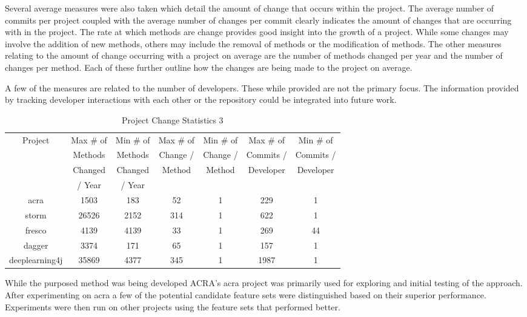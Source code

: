 Several average measures were also taken which detail the amount of change that occurs within the project. The average number of commits per project coupled with the average number of changes per commit clearly indicates the amount of changes that are occurring with in the project. The rate at which methods are change provides good insight into the growth of a project. While some changes may involve the addition of new methods, others may include the removal of methods or the modification of methods. The other measures relating to the amount of change occurring with a project on average are the number of methods changed per year and the number of changes per method. Each of these further outline how the changes are being made to the project on average.

A few of the measures are related to the number of developers. These while provided are not the primary focus. The information provided by tracking developer interactions with each other or the repository could be integrated into future work.

\begin{table}
\begin{center}
    \begin{tabular}{|c|c|c|c|c|c|c|}
        \hline
        Project & Max \# of & Min \# of & Max \# of & Min \# of & Max \# of & Min \# of \\
         & Methods & Methods & Change / & Change / & Commits / & Commits / \\
         & Changed & Changed & Method & Method & Developer & Developer \\
         & / Year & / Year & & & & \\
        \hline
        acra & 1503 & 183 & 52 & 1 & 229 & 1 \\
        storm & 26526 & 2152 & 314 & 1 & 622 & 1\\
        fresco & 4139 & 4139 & 33 & 1 & 269 & 44 \\
        dagger & 3374 & 171 & 65 & 1 & 157 & 1 \\
        deeplearning4j & 35869 & 4377 & 345 & 1 & 1987 & 1 \\
        \hline
    \end{tabular}
\end{center}
\caption{Project Change Statistics 3}
\label{tab:project_stats_3}
\end{table}

While the purposed method was being developed ACRA's acra project was primarily used for exploring and initial testing of the approach. After experimenting on acra a few of the potential candidate feature sets were distinguished based on their superior performance. Experiments were then run on other projects using the feature sets that performed better.

